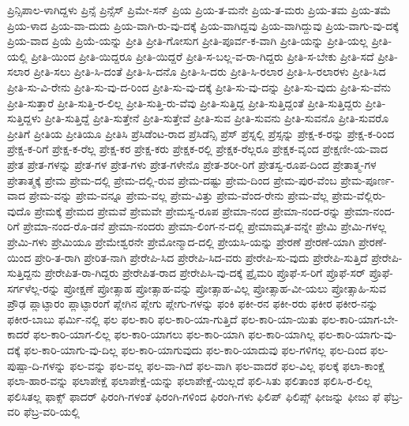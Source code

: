 {ಪ್ರಿನ್ಸಿಪಾಲ-ಳಾಗಿದ್ದಳು
ಪ್ರಿನ್ಸೆ
ಪ್ರಿನ್ಸೆಸ್
ಪ್ರಿಮೇ-ಸನ್
ಪ್ರಿಯ
ಪ್ರಿಯ-ತ-ಮನೇ
ಪ್ರಿಯ-ತ-ಮರು
ಪ್ರಿಯ-ತಮ
ಪ್ರಿಯ-ತಮೆ
ಪ್ರಿಯ-ಳಾದ
ಪ್ರಿಯ-ವಾ-ದುದು
ಪ್ರಿಯ-ವಾಗಿ-ರು-ವು-ದಕ್ಕೆ
ಪ್ರಿಯ-ವಾಗಿದ್ದವು
ಪ್ರಿಯ-ವಾಗಿದ್ದುವು
ಪ್ರಿಯ-ವಾಗು-ವು-ದಕ್ಕೆ
ಪ್ರಿಯ-ವಾದ
ಪ್ರಿಯೆ
ಪ್ರಿಯೆ-ಯನ್ನು
ಪ್ರೀತಿ
ಪ್ರೀತಿ-ಗೋಸುಗ
ಪ್ರೀತಿ-ಪೂರ್ವ-ಕ-ವಾಗಿ
ಪ್ರೀತಿ-ಯನ್ನು
ಪ್ರೀತಿ-ಯಲ್ಲ
ಪ್ರೀತಿ-ಯಲ್ಲಿ
ಪ್ರೀತಿ-ಯಿಂದ
ಪ್ರೀತಿ-ಯಿದ್ದರೂ
ಪ್ರೀತಿ-ಯಿದ್ದರೆ
ಪ್ರೀತಿ-ಸ-ಬಲ್ಲ-ವ-ರಾ-ಗಿದ್ದರು
ಪ್ರೀತಿ-ಸ-ಬೇಕು
ಪ್ರೀತಿ-ಸದೆ
ಪ್ರೀತಿ-ಸಲಾರ
ಪ್ರೀತಿ-ಸಲು
ಪ್ರೀತಿ-ಸಿ-ದಂತೆ
ಪ್ರೀತಿ-ಸಿ-ದನೊ
ಪ್ರೀತಿ-ಸಿ-ದರು
ಪ್ರೀತಿ-ಸಿ-ರಲಾರ
ಪ್ರೀತಿ-ಸಿ-ರಲಾರಳು
ಪ್ರೀತಿ-ಸಿದ
ಪ್ರೀತಿ-ಸು-ವಿ-ರೇನು
ಪ್ರೀತಿ-ಸು-ವು-ದ-ರಿಂದ
ಪ್ರೀತಿ-ಸು-ವು-ದಕ್ಕೆ
ಪ್ರೀತಿ-ಸು-ವು-ದನ್ನು
ಪ್ರೀತಿ-ಸು-ವುದು
ಪ್ರೀತಿ-ಸು-ವೆನು
ಪ್ರೀತಿ-ಸುತ್ತಾರೆ
ಪ್ರೀತಿ-ಸುತ್ತಿ-ರ-ಲಿಲ್ಲ
ಪ್ರೀತಿ-ಸುತ್ತಿ-ರು-ವೆವು
ಪ್ರೀತಿ-ಸುತ್ತಿದ್ದ
ಪ್ರೀತಿ-ಸುತ್ತಿದ್ದಂತೆ
ಪ್ರೀತಿ-ಸುತ್ತಿದ್ದರು
ಪ್ರೀತಿ-ಸುತ್ತಿದ್ದಳು
ಪ್ರೀತಿ-ಸುತ್ತಿದ್ದೆ
ಪ್ರೀತಿ-ಸುತ್ತೇನೆ
ಪ್ರೀತಿ-ಸುತ್ತೇವೆ
ಪ್ರೀತಿ-ಸುವ
ಪ್ರೀತಿ-ಸುವನು
ಪ್ರೀತಿ-ಸುವನೊ
ಪ್ರೀತಿ-ಸುವರೊ
ಪ್ರೀತಿಗೆ
ಪ್ರೀತಿಯ
ಪ್ರೀತಿಯೂ
ಪ್ರೀತಿಸಿ
ಪ್ರೆಸಿಡೆಂಟ-ರಾದ
ಪ್ರೆಸಿಡೆನ್ಸಿ
ಪ್ರೆಸ್
ಪ್ರೆಸ್ನಲ್ಲಿ
ಪ್ರೆಸ್ಸನ್ನು
ಪ್ರೇಕ್ಷ-ಕ-ರನ್ನು
ಪ್ರೇಕ್ಷ-ಕ-ರಿಂದ
ಪ್ರೇಕ್ಷ-ಕ-ರಿಗೆ
ಪ್ರೇಕ್ಷ-ಕ-ರೆಲ್ಲ
ಪ್ರೇಕ್ಷ-ಕರ
ಪ್ರೇಕ್ಷ-ಕರು
ಪ್ರೇಕ್ಷಕ-ರಲ್ಲಿ
ಪ್ರೇಕ್ಷಕ-ರೆಲ್ಲರೂ
ಪ್ರೇಕ್ಷಕ-ವೃಂದ
ಪ್ರೇಕ್ಷಣೀ-ಯ-ವಾದ
ಪ್ರೇತ
ಪ್ರೇತ-ಗಳನ್ನು
ಪ್ರೇತ-ಗಳ
ಪ್ರೇತ-ಗಳು
ಪ್ರೇತ-ಗಳೇನೊ
ಪ್ರೇತ-ಶರೀ-ರಿಗೆ
ಪ್ರೇತಸ್ವ-ರೂಪ-ದಿಂದ
ಪ್ರೇತಾತ್ಮ-ಗಳ
ಪ್ರೇತಾತ್ಮಕ್ಕೆ
ಪ್ರೇಮ
ಪ್ರೇಮ-ದಲ್ಲಿ
ಪ್ರೇಮ-ದಲ್ಲಿ-ರುವ
ಪ್ರೇಮ-ದಷ್ಟು
ಪ್ರೇಮ-ದಿಂದ
ಪ್ರೇಮ-ಪುರ-ವೆಂಬ
ಪ್ರೇಮ-ಪೂರ್ಣ-ವಾದ
ಪ್ರೇಮ-ವನ್ನು
ಪ್ರೇಮ-ವನ್ನೂ
ಪ್ರೇಮ-ವಲ್ಲ
ಪ್ರೇಮ-ವಿತ್ತು
ಪ್ರೇಮ-ವೆಂದ-ರೇನು
ಪ್ರೇಮ-ವೆಲ್ಲ
ಪ್ರೇಮ-ವೆಲ್ಲಿರು-ವುದೊ
ಪ್ರೇಮಕ್ಕೆ
ಪ್ರೇಮದ
ಪ್ರೇಮವೆ
ಪ್ರೇಮವೇ
ಪ್ರೇಮಸ್ವ-ರೂಪ
ಪ್ರೇಮಾ-ನಂದ
ಪ್ರೇಮಾ-ನಂದ-ರನ್ನು
ಪ್ರೇಮಾ-ನಂದ-ರಿಗೆ
ಪ್ರೇಮಾ-ನಂದ-ರೊ-ಡನೆ
ಪ್ರೇಮಾ-ನಂದರು
ಪ್ರೇಮಾ-ಲಿಂಗ-ನ-ದಲ್ಲಿ
ಪ್ರೇಮಾಮೃತ-ವನ್ನೇ
ಪ್ರೇಮಿ
ಪ್ರೇಮಿ-ಗಳಲ್ಲ
ಪ್ರೇಮಿ-ಗಳು
ಪ್ರೇಮಿಯೂ
ಪ್ರೇಮೇಶ್ವರನೇ
ಪ್ರೇಮೋನ್ಮಾದ-ದಲ್ಲಿ
ಪ್ರೇಯಸಿ-ಯನ್ನು
ಪ್ರೇರಣೆ
ಪ್ರೇರಣೆ-ಯಾಗಿ
ಪ್ರೇರಣೆ-ಯಿಂದ
ಪ್ರೇರಿ-ತ-ರಾಗಿ
ಪ್ರೇರಿತ-ನಾಗಿ
ಪ್ರೇರೇಪಿ-ಸಿದ
ಪ್ರೇರೇಪಿ-ಸಿದ-ವರು
ಪ್ರೇರೇಪಿ-ಸು-ವುದು
ಪ್ರೇರೇಪಿ-ಸುತ್ತಿದೆ
ಪ್ರೇರೇಪಿ-ಸುತ್ತಿದ್ದನು
ಪ್ರೇರೇಪಿತ-ರಾ-ಗಿದ್ದರು
ಪ್ರೇರೇಪಿತ-ರಾದ
ಪ್ರೇರೇಪಿಸಿ-ವು-ದಕ್ಕೆ
ಪ್ರೈಮರಿ
ಪ್ರೊಫೆ-ಸ-ರಿಗೆ
ಪ್ರೊಫೆ-ಸರ್
ಪ್ರೊಫೆ-ಸರ್ಗಳೆಲ್ಲ-ರನ್ನು
ಪ್ರೋಕ್ಷಣೆ
ಪ್ರೋತ್ಸಾಹ
ಪ್ರೋತ್ಸಾಹ-ವನ್ನು
ಪ್ರೋತ್ಸಾಹ-ವಿಲ್ಲ
ಪ್ರೋತ್ಸಾಹ-ವೀ-ಯಲು
ಪ್ರೋತ್ಸಾಹಿ-ಸುವ
ಪ್ರೌಢ
ಪ್ಲಾಟ್ಫಾರಂ
ಪ್ಲಾಟ್ಫಾರಂಗೆ
ಪ್ಲೇಗಿನ
ಪ್ಲೇಗು
ಪ್ಲೇಗು-ಗಳನ್ನು
ಫಂಕಿ
ಫಕೀ-ರನ
ಫಕೀ-ರರು
ಫಕೀರ
ಫಕೀರ-ನನ್ನು
ಫಕೀರ-ಬಾಬು
ಫರ್ಮಿ-ನಲ್ಲಿ
ಫಲ
ಫಲ-ಕಾರಿ
ಫಲ-ಕಾರಿ-ಯಾ-ಗುತ್ತಿದೆ
ಫಲ-ಕಾರಿ-ಯಾ-ಯಿತು
ಫಲ-ಕಾರಿ-ಯಾಗ-ಬೇ-ಕಾದರೆ
ಫಲ-ಕಾರಿ-ಯಾಗ-ಲಿಲ್ಲ
ಫಲ-ಕಾರಿ-ಯಾಗಲು
ಫಲ-ಕಾರಿ-ಯಾಗಿ
ಫಲ-ಕಾರಿ-ಯಾಗಿಲ್ಲ
ಫಲ-ಕಾರಿ-ಯಾಗು-ವು-ದಕ್ಕೆ
ಫಲ-ಕಾರಿ-ಯಾಗು-ವು-ದಿಲ್ಲ
ಫಲ-ಕಾರಿ-ಯಾಗುವುದು
ಫಲ-ಕಾರಿ-ಯಾದುವು
ಫಲ-ಗಳಿಗಲ್ಲ
ಫಲ-ದಿಂದ
ಫಲ-ಪುಷ್ಪಾ-ದಿ-ಗಳನ್ನು
ಫಲ-ವನ್ನು
ಫಲ-ವಲ್ಲ
ಫಲ-ವಾ-ಗಿದೆ
ಫಲ-ವಾಗಿ
ಫಲ-ವಾದರೆ
ಫಲ-ವಿಲ್ಲ
ಫಲಕ್ಕೆ
ಫಲಾ-ಕಾಂಕ್ಷೆ
ಫಲಾ-ಹಾರ-ವನ್ನು
ಫಲಾಪೇಕ್ಷೆ
ಫಲಾಪೇಕ್ಷೆ-ಯನ್ನು
ಫಲಾಪೇಕ್ಷೆ-ಯಿಲ್ಲದೆ
ಫಲಿ-ಸಿತು
ಫಲಿತಾಂಶ
ಫಲಿಸಿ-ರ-ಲಿಲ್ಲ
ಫಲಿಸಿತಲ್ಲ
ಫಾಕ್ಸ್
ಫಾದರ್
ಫಿರಂಗಿ-ಗಳಂತೆ
ಫಿರಂಗಿ-ಗಳಿಂದ
ಫಿರಂಗಿ-ಗಳು
ಫಿಲಿಪ್
ಫಿಲಿಪ್ಸ್
ಫೀಜನ್ನು
ಫೀಜು
ಫೆ
ಫೆಬ್ರ-ವರಿ
ಫೆಬ್ರ-ವರಿ-ಯಲ್ಲಿ
}
